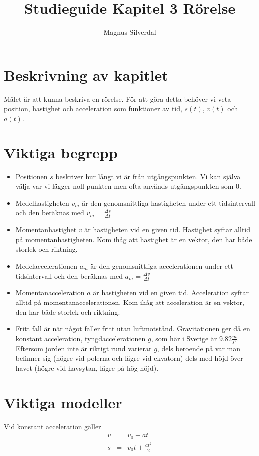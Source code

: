 \documentclass[11pt]{article}
\title{Studieguide Kapitel 3 Rörelse}
\author{Magnus Silverdal}
\begin{document}
    \maketitle
    \section{Beskrivning av kapitlet}
    Målet är att kunna beskriva en rörelse. För att göra detta behöver vi veta position, hastighet och acceleration som
    funktioner av tid, $s(t)$, $v(t)$ och $a(t)$.
    \section{Viktiga begrepp}
    \begin{itemize}
        \item Positionen $s$ beskriver hur långt vi är från utgångspunkten. Vi kan själva välja var vi lägger noll-punkten
        men ofta används utgångspunkten som 0.
        \item Medelhastigheten $v_m$ är den genomsnittliga hastigheten under ett tidsintervall och den beräknas med
        $v_m=\frac{\Delta s}{\Delta t}$
        \item Momentanhastighet $v$ är hastigheten vid en given tid. Hastighet syftar alltid på momentanhastigheten.
        Kom ihåg att hastighet är en vektor, den har både storlek och riktning.
        \item Medelaccelerationen $a_m$ är den genomsnittliga accelerationen under ett tidsintervall och den beräknas med
        $a_m=\frac{\Delta v}{\Delta t}$
        \item Momentanacceleration $a$ är hastigheten vid en given tid. Acceleration syftar alltid på momentanaccelerationen.
        Kom ihåg att acceleration är en vektor, den har både storlek och riktning.
        \item Fritt fall är när något faller fritt utan luftmotstånd. Gravitationen ger då en konstant acceleration,
        tyngdaccelerationen $g$, som här i Sverige är $9.82 \frac{m}{s^2}$. Eftersom jorden inte är riktigt rund varierar $g$,
        dels beroende på var man befinner sig (högre vid polerna och lägre vid ekvatorn) dels med höjd över havet (högre vid
        havsytan, lägre på hög höjd).
    \end{itemize}
    \section{Viktiga modeller}
    Vid konstant acceleration gäller
    \begin{eqnarray}
        v&=&v_0+at \\
        s&=&v_0 t +  \frac{at^2}{2}
    \end{eqnarray}
\end{document}
